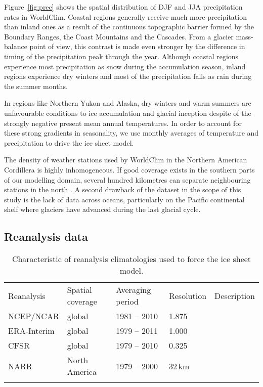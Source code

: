  Figure~\ref{fig:prec} shows the spatial distribution of DJF and JJA precipitation rates in WorldClim. Coastal regions generally receive much more precipitation than inland ones as a result of the continuous topographic barrier formed by the Boundary Ranges, the Coast Mountains and the Cascades. From a glacier mass-balance point of view, this contrast is made even stronger by the difference in timing of the precipitation peak through the year. Although coastal regions experience most precipitation as snow during the accumulation season, inland regions experience dry winters and most of the precipitation falls as rain during the summer months.

In regions like Northern Yukon and Alaska, dry winters and warm summers are unfavourable conditions to ice accumulation and glacial inception despite of the strongly negative present mean annual temperatures. In order to account for these strong gradients in seasonality, we use monthly averages of temperature and precipitation to drive the ice sheet model.

The density of weather stations used by WorldClim in the Northern American Cordillera is highly inhomogeneous. If good coverage exists in the southern parts of our modelling domain, several hundred kilometres can separate neighbouring stations in the north \citep{data:worldclim}. A second drawback of the dataset in the scope of this study is the lack of data across oceans, particularly on the Pacific continental shelf where glaciers have advanced during the last glacial cycle\needref.


\subsection{Reanalysis data}

\begin{table*}[t]
	\caption{Characteristic of reanalysis climatologies used to force the ice sheet model.}
	\label{tab:reanalyses}
	\vskip4mm
	\centering
	\begin{tabular}{lllll}
		\tophline
		Reanalysis& Spatial coverage& Averaging period& Resolution& Description\\
		\middlehline
		NCEP/NCAR&  global&     1981 -- 2010& 1.875\degree& \citet{data:ncar}\\
		ERA-Interim&global&     1979 -- 2011& 1.000\degree& \citet{data:erai}\\
		CFSR&       global&     1979 -- 2010& 0.325\degree& \citet{data:cfsr}\\
		NARR&       North America& 1979 -- 2000& 32\,km& \citet{data:narr}\\
		\bottomhline
	\end{tabular}
\end{table*}

